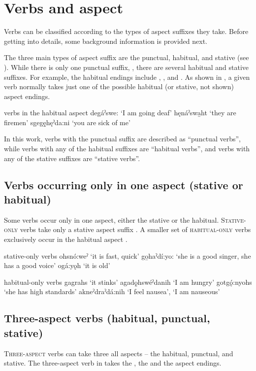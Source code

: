 \section{Verbs and aspect} \label{Verbs and aspect}
Verbs can be classified according to the types of aspect suffixes they take. Before getting into details, some background information is provided next.

The three main types of aspect suffix are the punctual, habitual, and stative (see ). While there is only one punctual suffix,  {\punctual}, there are several habitual and stative suffixes. For example, the habitual endings include , , and . As shown in , a given verb normally takes just one of the possible habitual (or stative, not shown) aspect endings.

\ea\label{ex:habitexampleagain} verbs in the habitual aspect
\ea degáˀswe: ‘I am going deaf’
\ex hęnáˀswa̱ht ‘they are firemen’
\ex sgegę̱hęˀda:ni ‘you are sick of me’
\z
\z

In this work, verbs with the punctual suffix are described as “punctual verbs”, while verbs with any of the habitual suffixes are “habitual verbs”, and verbs with any of the stative suffixes are “stative verbs”.


\subsection{Verbs occurring only in one aspect (stative or habitual)} \label{Verbs occurring only in one aspect (stative or habitual)}
Some verbs occur only in one aspect, either the stative or the habitual. \textsc{Stative-only} verbs take only a stative aspect suffix . A smaller set of \textsc{habitual-only} verbs exclusively occur in the habitual aspect .

\ea\label{ex:verbex12} stative-only verbs
\ea ohsnó:weˀ ‘it is fast, quick’ 
\ex go̱haˀdí:yo: ‘she is a good singer, she has a good voice’ 
\ex ogá:yǫh ‘it is old’ 
\z
\z

\ea\label{ex:verbex13} habitual-only verbs
\ea gagrahs ‘it stinks’
\ex agadǫ̱hswéˀdanih ‘I am hungry’ 
\ex gotgǫ́:nyohs ‘she has high standards’ 
\ex akneˀdraˀdá:nih ‘I feel nausea’, ‘I am nauseous’
\z
\z

\subsection{Three-aspect verbs (habitual, punctual, stative)} \label{Three-aspect verbs (habitual, punctual, stative)}
\textsc{Three-aspect} verbs can take three all aspects -- the habitual, punctual, and stative. The three-aspect verb in  takes the  \textsc{\habitual} , the  \textsc{\punctual}  and the \stem{-:} \textsc{\stative}  aspect endings.

